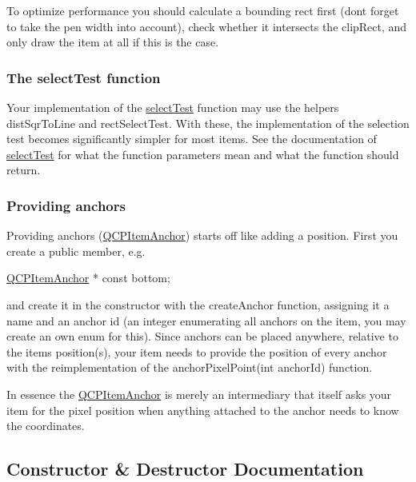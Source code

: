 To optimize performance you should calculate a bounding rect first (don\textquotesingle{}t forget to take the pen width into account), check whether it intersects the clip\+Rect, and only draw the item at all if this is the case.\hypertarget{classQCPAbstractItem_items-selection}{}\subsubsection{The select\+Test function}\label{classQCPAbstractItem_items-selection}
Your implementation of the \hyperlink{classQCPAbstractItem_a96d522d10ffc0413b9a366c6f7f0476b}{select\+Test} function may use the helpers dist\+Sqr\+To\+Line and rect\+Select\+Test. With these, the implementation of the selection test becomes significantly simpler for most items. See the documentation of \hyperlink{classQCPAbstractItem_a96d522d10ffc0413b9a366c6f7f0476b}{select\+Test} for what the function parameters mean and what the function should return.\hypertarget{classQCPAbstractItem_anchors}{}\subsubsection{Providing anchors}\label{classQCPAbstractItem_anchors}
Providing anchors (\hyperlink{classQCPItemAnchor}{Q\+C\+P\+Item\+Anchor}) starts off like adding a position. First you create a public member, e.\+g.


\begin{DoxyCode}
\hyperlink{classQCPItemAnchor}{QCPItemAnchor} * \textcolor{keyword}{const} bottom;
\end{DoxyCode}


and create it in the constructor with the create\+Anchor function, assigning it a name and an anchor id (an integer enumerating all anchors on the item, you may create an own enum for this). Since anchors can be placed anywhere, relative to the item\textquotesingle{}s position(s), your item needs to provide the position of every anchor with the reimplementation of the anchor\+Pixel\+Point(int anchor\+Id) function.

In essence the \hyperlink{classQCPItemAnchor}{Q\+C\+P\+Item\+Anchor} is merely an intermediary that itself asks your item for the pixel position when anything attached to the anchor needs to know the coordinates. 

\subsection{Constructor \& Destructor Documentation}
\hypertarget{classQCPAbstractItem_a9922507d8b4503a1fe1ed0b1030e23b6}{}
